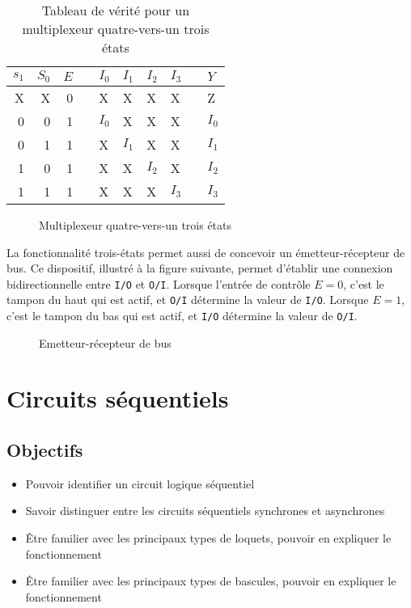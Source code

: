 \documentclass[11pt]{article}
\begin{document}
\begin{table}[htbp]
\caption{\label{tab:orga6c0079}Tableau de vérité pour un  multiplexeur quatre-vers-un trois états}
\centering
\begin{tabular}{rrrlllllll}
\(s_1\) & \(S_0\) & \(E\) &  & \(I_0\) & \(I_1\) & \(I_2\) & \(I_3\) &  & \(Y\)\\
\hline
X & X & 0 &  & X & X & X & X &  & Z\\
0 & 0 & 1 &  & \(I_0\) & X & X & X &  & \(I_0\)\\
0 & 1 & 1 &  & X & \(I_1\) & X & X &  & \(I_1\)\\
1 & 0 & 1 &  & X & X & \(I_2\) & X &  & \(I_2\)\\
1 & 1 & 1 &  & X & X & X & \(I_3\) &  & \(I_3\)\\
\end{tabular}
\end{table}


\begin{figure}[htbp]
\centering

\caption{\label{fig:orgc5d9db9}Multiplexeur quatre-vers-un trois états}
\end{figure}

La fonctionnalité trois-états permet aussi de concevoir un
émetteur-récepteur de bus. Ce dispositif, illustré à la figure
suivante, permet d'établir une connexion bidirectionnelle entre \texttt{I/O} et
\texttt{O/I}. Lorsque l'entrée de contrôle \(E = 0\), c'est le tampon du haut
qui est actif, et \texttt{O/I} détermine la valeur de \texttt{I/O}. Lorsque \(E = 1\),
c'est le tampon du bas qui est actif, et \texttt{I/O} détermine la valeur de
\texttt{O/I}.

\begin{figure}[htbp]
\centering

\caption{\label{fig:org3053f5d}Emetteur-récepteur de bus}
\end{figure}


\section{Circuits séquentiels}
\label{sec:org84c46ed}

\subsection{Objectifs}
\label{sec:orgb587e5d}
\begin{itemize}
\item Pouvoir identifier un circuit logique séquentiel
\item Savoir distinguer entre les circuits séquentiels synchrones et asynchrones
\item Être familier avec les principaux types de loquets, pouvoir en
expliquer le fonctionnement
\item Être familier avec les principaux types de bascules, pouvoir en
expliquer le fonctionnement
\end{itemize}
\end{document}
